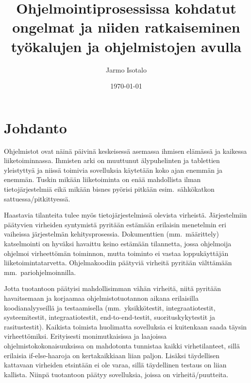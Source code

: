 \documentclass[finnish]{tktltiki2}
\title{Ohjelmointiprosessissa kohdatut ongelmat ja niiden ratkaiseminen työkalujen ja ohjelmistojen avulla}
\author{Jarmo Isotalo}
\date{\today}
\theoremstyle{definition}
\theoremstyle{remark}
\begin{document}

\frontmatter      %

\maketitle        %
\makeabstract     %

\tableofcontents  %


\mainmatter       %

\section{Johdanto}

Ohjelmistot ovat näinä päivinä keskeisessä asemassa ihmisen elämässä ja kaikessa liiketoiminnassa. Ihmisten arki on muuttunut älypuhelinten ja tablettien yleistyttyä ja niissä toimivia sovelluksia käytetään koko ajan enemmän ja enemmän. Tuskin mikään liiketoiminta on enää mahdollista ilman tietojärjestelmiä eikä mikään bisnes pyörisi pitkään esim.\ sähkökatkon sattuessa/pitkittyessä.

Haastavia tilanteita tulee myös tietojärjestelmissä olevista virheistä. Järjestelmiin päätyvien virheiden syntymistä pyritään estämään erilaisin menetelmin eri vaiheissa järjestelmän kehitysprosessia. Dokumenttien (mm.\ määrittely) katselmointi on hyväksi havaittu keino estämään tilannetta, jossa ohjelmoija ohjelmoi virheettömän toiminnon, mutta toiminto ei vastaa loppukäyttäjän liiketoimintatarvetta. Ohjelmakoodiin päätyviä virheitä pyritään välttämään mm.\ pariohjelmoinnilla.

Jotta tuotantoon päätyisi mahdollisimman vähän virheitä, niitä pyritään havaitsemaan ja korjaamaa ohjelmistotuotannon aikana erilaisilla koodianalyyseillä ja testaamisella (mm.\ yksikkötestit, integraatiotestit, systeemitestit, integraatiotestit, end-to-end-testit, suorituskykytestit ja rasitustestit). Kaikista toimista huolimatta sovelluksia ei kuitenkaan saada täysin virheettömiksi. Erityisesti monimutkaisissa ja laajoissa ohjelmistokokonaisuuksissa on mahdotonta tunnistaa kaikki virhetilanteet, sillä erilaisia if-else-haaroja on kertakaikkiaan liian paljon. Lisäksi täydellisen kattavaan virheiden etsintään ei ole varaa, sillä täydellinen testaus on liian kallista. Niinpä tuotantoon päätyy sovelluksia, joissa on virheitä/puutteita.
\end{document}
